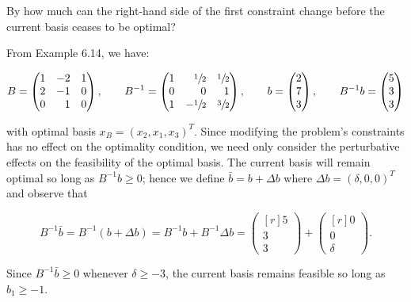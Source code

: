 By how much can the right-hand side of the first constraint change before the current basis ceases to be optimal?

\begin{solution}
  From Example 6.14, we have:

  $$
  B = \begin{pmatrix*}[r]
    1 & -2 & 1 \\
    2 & -1 & 0 \\
    0 &  1 & 0
  \end{pmatrix*}, \qquad B^{-1} = \begin{pmatrix*}[r]
    1 &  \sfrac{1}{2} & \sfrac{1}{2} \\
    0 &             0 &            1 \\
    1 & -\sfrac{1}{2} & \sfrac{3}{2} \\
  \end{pmatrix*}, \qquad b = \begin{pmatrix*}[r]
    2 \\
    7 \\
    3
  \end{pmatrix*}, \qquad B^{-1} b = \begin{pmatrix*}[r]
    5 \\
    3 \\
    3
  \end{pmatrix*}
  $$

  with optimal basis $x_B = \left( x_2, x_1, x_3 \right)^T$. Since modifying the problem's constraints has no effect on
  the optimality condition, we need only consider the perturbative effects on the feasibility of the optimal basis. The
  current basis will remain optimal so long as $B^{-1}b \ge 0$; hence we define $\bar{b} = b + \Delta b$ where 
  $\Delta b = (\delta, 0, 0)^T$ and observe that
  
  $$
  B^{-1}\bar{b} = B^{-1} \left( b + \Delta b \right) = B^{-1}b + B^{-1}\Delta b = \begin{pmatrix*}[r]
    5 \\
    3 \\
    3 
  \end{pmatrix*} + \begin{pmatrix*}[r]
    0 \\
    0 \\
    \delta
  \end{pmatrix*}.
  $$

  Since $B^{-1}\bar{b} \ge 0$ whenever $\delta \ge -3$, the current basis remains feasible so long as $b_1 \ge -1$.
  \ \\
\end{solution}
